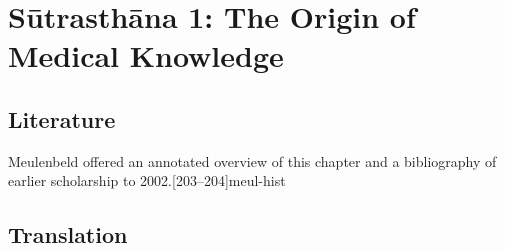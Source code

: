 
\chapter{Sūtrasthāna 1: The Origin of Medical Knowledge}

\section{Literature}

Meulenbeld offered an annotated overview of this chapter and a bibliography
of earlier scholarship to 2002.[203--204]{meul-hist} 

\section{Translation}

